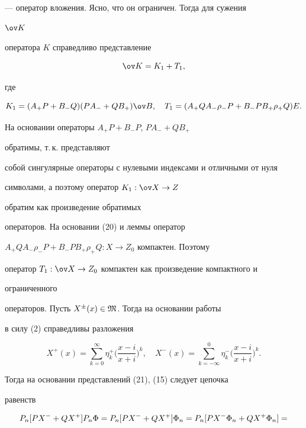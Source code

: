 \begin{pf}
--- оператор вложения. Ясно, что он ограничен. Тогда для сужения 


$\ov K$ 


оператора $K$ справедливо \cite{8} представление 


$$ 


\ov K=K_1+T_1, 


$$ 


где 


$$ 


K_1=(A_+P+B_-Q)(PA_-+QB_+)\ov B,\quad 


T_1=(A_+Q A_-\rho_-P+B_-P B_+\rho_+Q)E. 


$$ 


На основании \cite{6} операторы $A_+P+B_-P$, $PA_-+QB_+$ 


обратимы, т.\,к. представляют 


собой сингулярные операторы с нулевыми индексами и отличными от нуля 


символами, а поэтому оператор $K_1:\ov X\to Z$ 


обратим как произведение обратимых 


операторов. На основании (20) и леммы оператор 


$A_+QA_-\rho_-P+B_-PB_+\rho_+Q:X\to Z_0$ компактен. Поэтому 


оператор $T_1:\ov X\to Z_0$ компактен как произведение компактного и 


ограниченного 


операторов. Пусть $X^\pm(x)\in\frak M$. Тогда на основании работы 


\cite{5} в силу (2) справедливы разложения 


\begin{equation} 


X^+(x)=\sum^\infty_{k=0}\eta^+_k\biggl(\frac{x-i}{x+i}\biggr)^k, 


\quad 


X^-(x)=\sum^0_{k=-\infty}\eta^-_k\biggl(\frac{x-i}{x+i}\biggr)^k. 


\end{equation} 


Тогда на основании представлений (21), (15) следует цепочка 


равенств 


\begin{align} 


&P_n[PX^-+QX^+]P_n\Phi=P_n[PX^-+QX^+]\Phi_n= 


P_n[PX^-\Phi_n+QX^+\Phi_n]=\notag \\ 



\end{align}
\end{pf}
